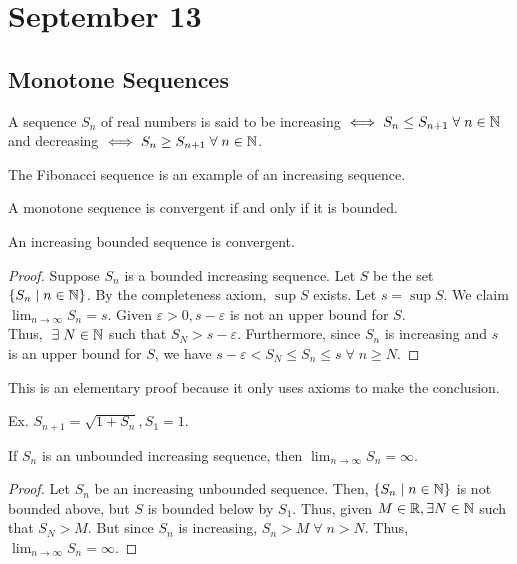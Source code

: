 \section{September 13}

\subsection{Monotone Sequences}
\begin{definition}
    A sequence $S_n$ of real numbers is said to be increasing $\iff S_n \leq S_{n+1} \;\forall\; n \in \mathbb{N}$ and decreasing $\iff S_n \geq S_{n+1} \;\forall\; n \in \mathbb{N}$.
\end{definition}
\begin{remark}
    The Fibonacci sequence is an example of an increasing sequence.
\end{remark}

\begin{definition}
    A monotone sequence is convergent if and only if it is bounded.
\end{definition}

\begin{theorem}
    An increasing bounded sequence is convergent.
\end{theorem}
\begin{proof}
    Suppose $S_n$ is a bounded increasing sequence. Let $S$ be the set $\{S_n \mid n \in \mathbb{N}\}$. By the completeness axiom, $\sup S$ exists. Let $s = \sup S$. We claim $\lim_{n \to \infty} S_n = s$. Given $\varepsilon > 0, s - \varepsilon$ is not an upper bound for $S$. \\ Thus, $\;\exists\; N \in \mathbb{N}$ such that $S_N > s - \varepsilon$. Furthermore, since $S_n$ is increasing and $s$ is an upper bound for $S$, we have $s - \varepsilon < S_N \leq S_n \leq s \;\forall\; n \geq N$.
\end{proof}
\begin{remark}
    This is an elementary proof because it only uses axioms to make the conclusion.
\end{remark}
Ex. $S_{n+1} = \sqrt{1 + S_n}, S_1 = 1$.


\begin{theorem}
    If $S_n$ is an unbounded increasing sequence, then $\lim_{n \to \infty} S_n = \infty$.
\end{theorem}
\begin{proof}
    Let $S_n$ be an increasing unbounded sequence. Then, $\{S_n \mid n \in \mathbb{N}\}$ is not bounded above, but $S$ is bounded below by $S_1$. Thus, given $M \in \mathbb{R}, \exists N \in \mathbb{N}$ such that $S_N > M$. But since $S_n$ is increasing, $S_n > M \;\forall\; n > N$. Thus, $\lim_{n \to \infty} S_n = \infty$.
\end{proof}